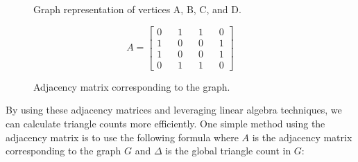 \documentclass[11pt, margin=1in]{article}
\begin{document}
\begin{figure}[H]
    \centering
    \begin{minipage}{0.45\textwidth}
        \caption{Graph representation of vertices A, B, C, and D.}
    \end{minipage}%
    \hfill
    \begin{minipage}{0.45\textwidth}
        \[
        A =
        \begin{bmatrix}
        0 & \hspace{10pt} 1 & \hspace{10pt} 1 & \hspace{10pt} 0 \\
        1 & \hspace{10pt} 0 & \hspace{10pt} 0 & \hspace{10pt} 1 \\
        1 & \hspace{10pt} 0 & \hspace{10pt} 0 & \hspace{10pt} 1 \\
        0 & \hspace{10pt} 1 & \hspace{10pt} 1 & \hspace{10pt} 0
        \end{bmatrix}
        \]
        \caption{Adjacency matrix corresponding to the graph.}
    \end{minipage}
\end{figure}

By using these adjacency matrices and leveraging linear algebra techniques, we can calculate triangle counts more efficiently. 
One simple method using the adjacency matrix is to use the following formula where $A$ is the adjacency matrix corresponding to the graph $G$ and $\Delta$ is the global triangle count in $G$:
\end{document}
